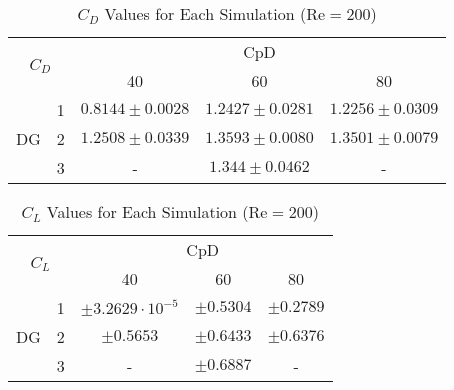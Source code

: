 \begin{table}[htp]
	\centering
	\def\arraystretch{1.5}
	\begin{tabular}{|c|c|c|c|c|}
		\hline
		\multicolumn{2}{|c|}{\multirow{2}{*}{$C_D$}} & \multicolumn{3}{c|}{CpD} \\ \cline{3-5} 
		\multicolumn{2}{|c|}{}                       & 40     & 60    & 80    \\ \hline
		\multirow{3}{*}{DG}            & 1           &   $0.8144\pm 0.0028$     &     $1.2427 \pm 0.0281$  &     $1.2256 \pm 0.0309$   \\ \cline{2-5} 
		& 2           &     $1.2508 \pm 0.0339$   &   $1.3593 \pm 0.0080$    &     $1.3501 \pm 0.0079$   \\ \cline{2-5} 
		& 3           &      -  &     $1.344 \pm 0.0462$   &     -   \\ \hline
	\end{tabular}
	\caption[$C_D$ Values for Each simulation]{$C_D$ Values for Each Simulation ($\text{Re} = 200$)}	
	\label{C_D200}
\end{table}
\begin{table}[htp]
	\centering
	\def\arraystretch{1.5}
	\begin{tabular}{|c|c|c|c|c|}
		\hline
		\multicolumn{2}{|c|}{\multirow{2}{*}{$C_L$}} & \multicolumn{3}{c|}{CpD} \\ \cline{3-5} 
		\multicolumn{2}{|c|}{}                       & 40     & 60    & 80    \\ \hline
		\multirow{3}{*}{DG}            & 1           &    $\pm 3.2629 \cdot 10^{-5}$    &    $\pm 0.5304$   &    $\pm 0.2789$    \\ \cline{2-5} 
		& 2           &     $\pm 0.5653$   &    $\pm 0.6433$   &     $\pm 0.6376$   \\ \cline{2-5} 
		& 3           &     -   &    $\pm 0.6887$  &    -    \\ \hline
	\end{tabular}
	\caption{$C_L$ Values for Each Simulation ($\text{Re} = 200$)}	
	\label{CL200}
\end{table}
